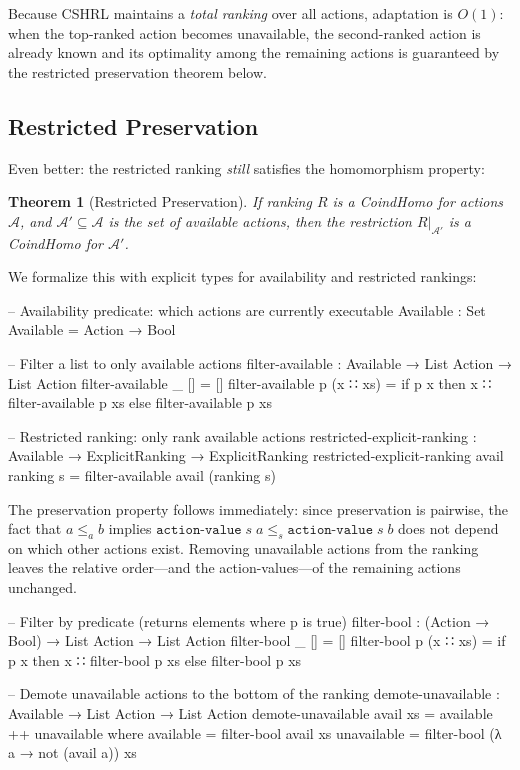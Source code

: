 \documentclass[9pt,a4paper]{article}
\theoremstyle{plain}
\newtheorem{theorem}{Theorem}
\theoremstyle{definition}
\theoremstyle{remark}
\begin{document}
Because CSHRL maintains a \emph{total ranking} over all actions, adaptation is $O(1)$: when the top-ranked action becomes unavailable, the second-ranked action is already known and its optimality among the remaining actions is guaranteed by the restricted preservation theorem below.

\subsection{Restricted Preservation}

Even better: the restricted ranking \emph{still} satisfies the homomorphism property:

\begin{theorem}[Restricted Preservation]
If ranking $R$ is a CoindHomo for actions $\mathcal{A}$, and $\mathcal{A}' \subseteq \mathcal{A}$ is the set of available actions, then the restriction $R|_{\mathcal{A}'}$ is a CoindHomo for $\mathcal{A}'$.
\end{theorem}

We formalize this with explicit types for availability and restricted rankings:

\begin{code}
  -- Availability predicate: which actions are currently executable
  Available : Set
  Available = Action → Bool

  -- Filter a list to only available actions
  filter-available : Available → List Action → List Action
  filter-available _ []       = []
  filter-available p (x ∷ xs) = 
    if p x then x ∷ filter-available p xs else filter-available p xs

  -- Restricted ranking: only rank available actions
  restricted-explicit-ranking : Available → ExplicitRanking → ExplicitRanking
  restricted-explicit-ranking avail ranking s = filter-available avail (ranking s)
\end{code}

\noindent The preservation property follows immediately: since preservation is pairwise, the fact that $a \le_a b$ implies $\texttt{action-value}\; s\; a \le_s \texttt{action-value}\; s\; b$ does not depend on which other actions exist.  Removing unavailable actions from the ranking leaves the relative order---and the action-values---of the remaining actions unchanged.

\begin{code}
  -- Filter by predicate (returns elements where p is true)
  filter-bool : (Action → Bool) → List Action → List Action
  filter-bool _ [] = []
  filter-bool p (x ∷ xs) = 
    if p x then x ∷ filter-bool p xs else filter-bool p xs

  -- Demote unavailable actions to the bottom of the ranking
  demote-unavailable : Available → List Action → List Action
  demote-unavailable avail xs = available ++ unavailable
    where
      available   = filter-bool avail xs
      unavailable = filter-bool (λ a → not (avail a)) xs
\end{code}
\end{document}
